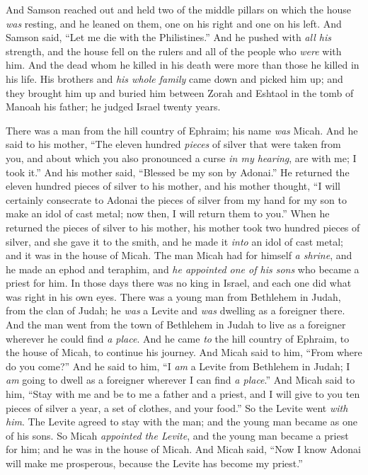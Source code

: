\begin{biblechapter}
\verse And Samson reached out and held two of the middle pillars on which the house \textit{was} resting, and he leaned on them, one on his right and one on his left.
\verse And Samson said, “Let me die with the Philistines.” And he pushed with \textit{all his} strength, and the house fell on the rulers and all of the people who \textit{were} with him. And the dead whom he killed in his death were more than those he killed in his life.
\verse His brothers and \textit{his whole family} came down and picked him up; and they brought him up and buried him between Zorah and Eshtaol in the tomb of Manoah his father; he judged Israel twenty years.
\end{biblechapter}

\begin{biblechapter} %
 There was a man from the hill country of Ephraim; his name \textit{was} Micah.
\verse And he said to his mother, “The eleven hundred \textit{pieces} of silver that were taken from you, and about which you also pronounced a curse \textit{in my hearing}, are with me; I took it.” And his mother said, “Blessed be my son by Adonai.”
\verse He returned the eleven hundred pieces of silver to his mother, and his mother thought, “I will certainly consecrate to Adonai the pieces of silver from my hand for my son to make an idol of cast metal; now then, I will return them to you.”
\verse When he returned the pieces of silver to his mother, his mother took two hundred pieces of silver, and she gave it to the smith, and he made it \textit{into} an idol of cast metal; and it was in the house of Micah.
\verse The man Micah had for himself \textit{a shrine}, and he made an ephod and teraphim, and \textit{he appointed one of his sons} who became a priest for him.
\verse In those days there was no king in Israel, and each one did what was right in his own eyes.
\verse There was a young man from Bethlehem in Judah, from the clan of Judah; he \textit{was} a Levite and \textit{was} dwelling as a foreigner there.
\verse And the man went from the town of Bethlehem in Judah to live as a foreigner wherever he could find \textit{a place}. And he came \textit{to} the hill country of Ephraim, to the house of Micah, to continue his journey.
\verse And Micah said to him, “From where do you come?” And he said to him, “I \textit{am} a Levite from Bethlehem in Judah; I \textit{am} going to dwell as a foreigner wherever I can find \textit{a place}.”
\verse And Micah said to him, “Stay with me and be to me a father and a priest, and I will give to you ten pieces of silver a year, a set of clothes, and your food.” So the Levite went \textit{with him}.
\verse The Levite agreed to stay with the man; and the young man became as one of his sons.
\verse So Micah \textit{appointed the Levite}, and the young man became a priest for him; and he was in the house of Micah.
\verse And Micah said, “Now I know Adonai will make me prosperous, because the Levite has become my priest.”
\end{biblechapter}

